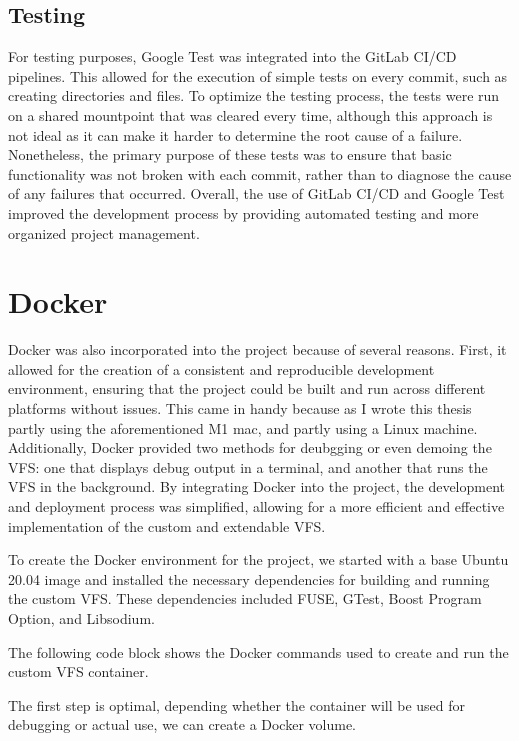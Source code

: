 \subsection{Testing}\label{subsec:testing}

For testing purposes, Google Test was integrated into the GitLab CI/CD pipelines.
This allowed for the execution of simple tests on every commit, such as creating directories and files.
To optimize the testing process, the tests were run on a shared mountpoint that was cleared every time, although this approach is not ideal as it can make it harder to determine the root cause of a failure.
Nonetheless, the primary purpose of these tests was to ensure that basic functionality was not broken with each commit, rather than to diagnose the cause of any failures that occurred.
Overall, the use of GitLab CI/CD and Google Test improved the development process by providing automated testing and more organized project management.

\section{Docker}\label{sec:docker}

Docker\cite{docker} was also incorporated into the project because of several reasons.
First, it allowed for the creation of a consistent and reproducible development environment, ensuring that the project could be built and run across different platforms without issues.
This came in handy because as I wrote this thesis partly using the aforementioned M1 mac, and partly using a Linux machine.
Additionally, Docker provided two methods for deubgging or even demoing the VFS: one that displays debug output in a terminal, and another that runs the VFS in the background.
By integrating Docker into the project, the development and deployment process was simplified, allowing for a more efficient and effective implementation of the custom and extendable VFS.

To create the Docker environment for the project, we started with a base Ubuntu 20.04 image and installed the necessary dependencies for building and running the custom VFS\@.
These dependencies included FUSE, GTest, Boost Program Option, and Libsodium.

The following code block shows the Docker commands used to create and run the custom VFS container.

The first step is optimal, depending whether the container will be used for debugging or actual use, we can create a Docker volume.

